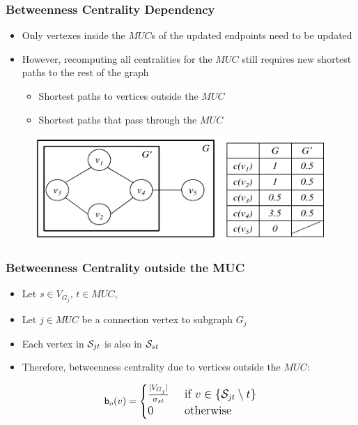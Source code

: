 \begin{frame}
  \frametitle{Betweenness Centrality Dependency}

  \begin{itemize}
    \item Only vertexes inside the $MUC$s of the updated endpoints need to be updated
    \item However, recomputing all centralities for the $MUC$ still requires new shortest paths to the rest of the graph
      \begin{itemize}
        \item Shortest paths to vertices outside the $MUC$
        \item Shortest paths that pass through the $MUC$
      \end{itemize}
  \end{itemize}

  \begin{figure}[t]
    \centering
    \includegraphics[width=\textwidth, height=0.6\textheight, keepaspectratio]{imgs/qube-btwmuc}
  \end{figure}
\end{frame}


\begin{frame}
  \frametitle{Betweenness Centrality outside the MUC}

  \begin{itemize}
    \item Let $s \in V_{G_j}$, $t \in MUC$,
    \item Let $j \in MUC$ be a connection vertex to subgraph $G_j$
    \item Each vertex in $\mathcal{S}_{jt}$ is also in $\mathcal{S}_{st}$
    \item Therefore, betweenness centrality due to vertices outside the $MUC$:
  \end{itemize}

  \begin{align*}
    \large
    \mathsf{b}_{o}(v) = \begin{cases}
      \frac{|V_{G_j}|}{\sigma_{st}}		& \text{ if } v \in\{ \mathcal{S}_{jt} \setminus t \} \\
      0 						& \text{ otherwise }
    \end{cases}
  \end{align*}
\end{frame}


